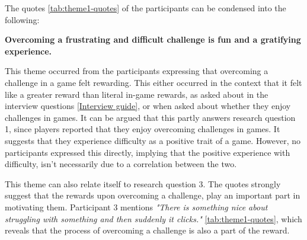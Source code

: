 The quotes \ref{tab:theme1-quotes} of the participants can be condensed into the following:
\begin{center}
    \textbf{Overcoming a frustrating and difficult challenge is fun and a gratifying experience.}
\end{center}

This theme occurred from the participants expressing that overcoming a challenge in a game felt rewarding. This either occurred in the context that it felt like a greater reward than literal in-game rewards, as asked about in the interview questions \ref{Interview guide}, or when asked about whether they enjoy challenges in games. It can be argued that this partly answers research question 1, since players reported that they enjoy overcoming challenges in games. It suggests that they experience difficulty as a positive trait of a game. However, no participants expressed this directly, implying that the positive experience with difficulty, isn't necessarily due to a correlation between the two. 

This theme can also relate itself to research question 3. The quotes strongly suggest that the rewards upon overcoming a challenge, play an important part in motivating them. Participant 3 mentions \textit{"There is something nice about struggling with something and then suddenly it clicks."}  \ref{tab:theme1-quotes},  which reveals that the process of overcoming a challenge is also a part of the reward.


